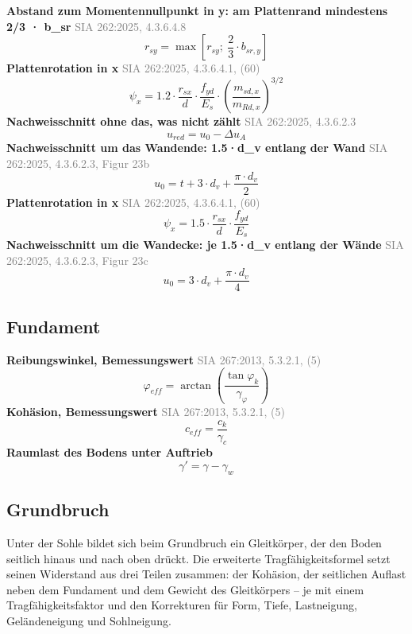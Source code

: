 \documentclass[11pt,a4paper]{article}
\newcommand{\normref}[1]{{\small\textcolor{gray}{#1}}}
\begin{document}
\noindent\textbf{Abstand zum Momentennullpunkt in y: am Plattenrand mindestens 2/3 · b\_sr} \hfill \normref{SIA 262:2025, 4.3.6.4.8}
\begin{equation*}
r_{sy} = \max\left[r_{sy};\ \frac{2}{3} \cdot b_{sr,y}\right]
\end{equation*}
\noindent\textbf{Plattenrotation in x} \hfill \normref{SIA 262:2025, 4.3.6.4.1, (60)}
\begin{equation*}
\psi_x = 1.2 \cdot \frac{r_{sx}}{d} \cdot \frac{f_{yd}}{E_s} \cdot \left(\frac{m_{sd,x}}{m_{Rd,x}}\right)^{3/2}
\end{equation*}
\noindent\textbf{Nachweisschnitt ohne das, was nicht zählt} \hfill \normref{SIA 262:2025, 4.3.6.2.3}
\begin{equation*}
u_{red} = u_0 - \Delta u_A
\end{equation*}
\noindent\textbf{Nachweisschnitt um das Wandende: 1.5·d\_v entlang der Wand} \hfill \normref{SIA 262:2025, 4.3.6.2.3, Figur 23b}
\begin{equation*}
u_0 = t + 3 \cdot d_v + \frac{\pi \cdot d_v}{2}
\end{equation*}
\noindent\textbf{Plattenrotation in x} \hfill \normref{SIA 262:2025, 4.3.6.4.1, (60)}
\begin{equation*}
\psi_x = 1.5 \cdot \frac{r_{sx}}{d} \cdot \frac{f_{yd}}{E_s}
\end{equation*}
\noindent\textbf{Nachweisschnitt um die Wandecke: je 1.5·d\_v entlang der Wände} \hfill \normref{SIA 262:2025, 4.3.6.2.3, Figur 23c}
\begin{equation*}
u_0 = 3 \cdot d_v + \frac{\pi \cdot d_v}{4}
\end{equation*}
\subsection{Fundament}
\noindent\textbf{Reibungswinkel, Bemessungswert} \hfill \normref{SIA 267:2013, 5.3.2.1, (5)}
\begin{equation*}
\varphi_{eff} = \arctan\left(\frac{\tan \varphi_k}{\gamma_{\varphi}}\right)
\end{equation*}
\noindent\textbf{Kohäsion, Bemessungswert} \hfill \normref{SIA 267:2013, 5.3.2.1, (5)}
\begin{equation*}
c_{eff} = \frac{c_k}{\gamma_c}
\end{equation*}
\noindent\textbf{Raumlast des Bodens unter Auftrieb}
\begin{equation*}
\gamma' = \gamma - \gamma_w
\end{equation*}
\subsection{Grundbruch}
Unter der Sohle bildet sich beim Grundbruch ein Gleitkörper, der den Boden seitlich hinaus und nach oben drückt. Die erweiterte Tragfähigkeitsformel setzt seinen Widerstand aus drei Teilen zusammen: der Kohäsion, der seitlichen Auflast neben dem Fundament und dem Gewicht des Gleitkörpers -- je mit einem Tragfähigkeitsfaktor und den Korrekturen für Form, Tiefe, Lastneigung, Geländeneigung und Sohlneigung.
\end{document}

